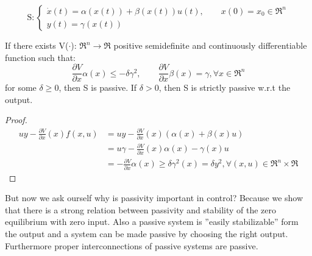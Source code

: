 \[\text{S}: \begin{cases}
\dot{x}(t)=\alpha(x(t))+\beta(x(t))u(t), \qquad x(0)=x_0\in\Re^n\\
y(t)=\gamma(x(t))
\end{cases}
\]
\begin{prop}
	If there exists V($\cdot$): $\Re^n \to \Re$ positive semidefinite and continuously differentiable function such that: \[\frac{\partial V}{\partial x}\alpha(x)\le -\delta \gamma^2, \qquad \frac{\partial V}{\partial x}\beta(x) = \gamma, \forall x \in \Re^n\] for some $\delta\ge0$, then S is passive. If $\delta>0$, then S is strictly passive w.r.t the output.
\end{prop}
\begin{proof}
	\[
	\begin{aligned}
		uy-\frac{\partial V}{\partial x}(x)f(x,u)&=uy-\frac{\partial V}{\partial x}(x)(\alpha(x)+\beta(x)u)\\
		&=u\gamma-\frac{\partial V}{\partial x}(x)\alpha(x)-\gamma(x)u\\
		&=-\frac{\partial V}{\partial x}\alpha(x)\ge \delta\gamma^2(x)=\delta y^2, \forall(x,u)\in\Re^n\times\Re
	\end{aligned}
	\]
\end{proof}
But now we ask ourself why is passivity important in control? Because we show that there is a strong relation between passivity and stability of the zero equilibrium with zero input. Also a passive system is ''easily stabilizable'' form the output and a system can be made passive by choosing the right output. Furthermore proper interconnections of passive systems are passive.
